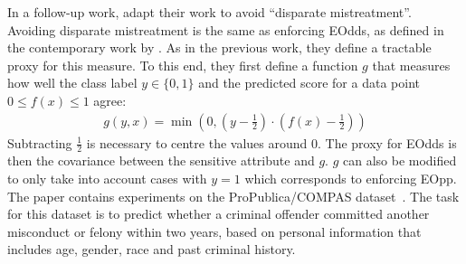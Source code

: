 In a follow-up work, \citet{zafar2017fairnesstreatment} adapt their work to avoid ``disparate
mistreatment''. Avoiding disparate mistreatment is the same as enforcing \acf{EOdds}, as defined in
the contemporary work by \citet{hardt2016equality}. As in the previous work, they define a
tractable proxy for this measure. To this end, they first define a function \(g\) that measures how
well the class label \(y \in \{0, 1\}\) and the predicted score for a data point \(0 \leq f(x) \leq
1\) agree: \begin{align} \label{eq:zafar-constraint-2} g(y, x) = \min \left(0, \left(y -
  \tfrac{1}{2}\right) \cdot \left(f(x) - \tfrac{1}{2}\right)\right) \end{align} Subtracting
  \(\tfrac{1}{2}\) is necessary to centre the values around \(0\). The proxy for \ac{EOdds} is then
  the covariance between the sensitive attribute and \(g\). \(g\) can also be modified to only take
  into account cases with \(y=1\) which corresponds to enforcing \acf{EOpp}. The paper contains
  experiments on the ProPublica/COMPAS dataset~\citep{angwin2016machine}. The task for this dataset
  is to predict whether a criminal offender committed another misconduct or felony within two
  years, based on personal information that includes age, gender, race and past criminal history.

